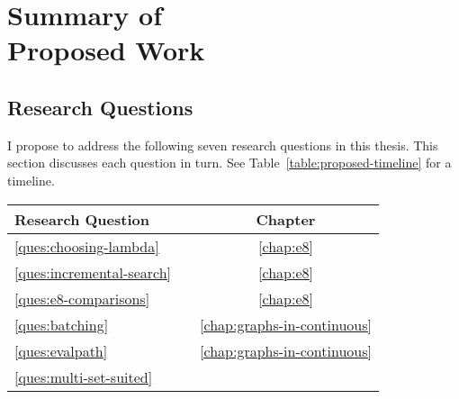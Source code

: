 \chapter[Summary of Proposed Work]{Summary of\\Proposed Work}
\label{chap:proposed}

\section{Research Questions}
\label{sec:research-questions}

I propose to address the following seven research questions
in this thesis.
This section discusses each question in turn.
See Table~\ref{table:proposed-timeline} for a timeline.

\begin{center}
\begin{tabular}{llc}
\toprule
   \multicolumn{2}{l}{Research Question}
      & Chapter \\
\midrule
   \ref{ques:choosing-lambda}
      &
      \begin{minipage}[c]{0.75\columnwidth}%
      \nameref{ques:choosing-lambda}
      \end{minipage}%
      & \ref{chap:e8} \\[12pt]
   \ref{ques:incremental-search}
      &
      \begin{minipage}[c]{0.75\columnwidth}%
      \nameref{ques:incremental-search}
      \end{minipage}%
      & \ref{chap:e8} \\[12pt]
   \ref{ques:e8-comparisons}
      &
      \begin{minipage}[c]{0.75\columnwidth}%
      \nameref{ques:e8-comparisons}
      \end{minipage}%
      & \ref{chap:e8} \\[12pt]
   \ref{ques:batching}
      &
      \begin{minipage}[c]{0.75\columnwidth}%
      \nameref{ques:batching}
      \end{minipage}%
      & \ref{chap:graphs-in-continuous} \\[12pt]
   \ref{ques:evalpath}
      &
      \begin{minipage}[c]{0.75\columnwidth}%
      \nameref{ques:evalpath}
      \end{minipage}%
      & \ref{chap:graphs-in-continuous} \\[12pt]
   \ref{ques:multi-set-suited}
      &
      \begin{minipage}[c]{0.75\columnwidth}%

\end{minipage}
\end{tabular}
\end{center}
